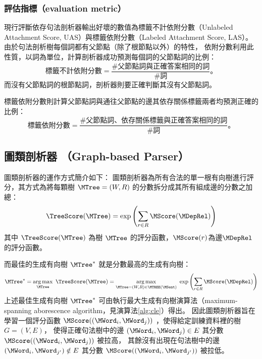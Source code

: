 \subsubsection{評估指標（evaluation metric）}

現行評斷依存句法剖析器輸出好壞的數值為標籤不計依附分數（Unlabeled Attachment Score, UAS）與標籤依附分數（Labeled Attachment Score, LAS）。
由於句法剖析樹每個詞都有父節點（除了根節點以外）的特性，
依附分數利用此性質，以詞為單位，計算剖析器成功預測每個詞的父節點詞的比例：
\begin{equation}
    \textrm{標籤不計依附分數} = \frac{\#\textrm{父節點詞與正確答案相同的詞}}{\#\textrm{詞}} \textrm{。}
\end{equation}
而沒有父節點詞的根節點詞，剖析器則要正確判斷其沒有父節點詞。

標籤依附分數則計算父節點詞與通往父節點的邊其依存關係標籤兩者均預測正確的比例：
\begin{equation}
    \textrm{標籤依附分數} = \frac{\#\textrm{父節點詞、依存關係標籤與正確答案相同的詞}}{\#\textrm{詞}} \textrm{。}
\end{equation}



\subsection{圖類剖析器 （Graph-based Parser）}
\label{subsec:graph_parser}

圖類剖析器的運作方式簡介如下：
圖類剖析器為所有合法的單一根有向樹進行評分，其方式為將每顆樹 $\MTree = (W, R)$ 的分數拆分成其所有組成邊的分數之加總：
\begin{equation}
    \TreeScore (\MTree) = \exp{ \left( \sum_{r \in R} \MScore(\MDepRel) \right) }
\end{equation}
其中 $\TreeScore(\MTree)$ 為樹 $\MTree$ 的評分函數，$\MScore(r)$為邊$\MDepRel$的評分函數。

而最佳的生成有向樹 $\MTree^{*}$ 就是分數最高的生成有向樹：
\begin{equation}
    \MTree^{*} = \argmax_{\MTree}\ \TreeScore (\MTree) = \argmax_{\MTree = (W, R) \in \MakeUppercase{\MTree}(\MSent)}\ \exp{ \left( \sum_{r \in R} \MScore(\MDepRel) \right) }
\end{equation}
上述最佳生成有向樹 $\MTree^{*}$ 可由執行最大生成有向樹演算法（maximum-spanning aborescence algorithm，見演算法\ref{alg:cle}）得出。
因此圖類剖析器旨在學習一個評分函數 $\MScore((\MWord_{i}, \MWord_{j}))$ ，使得給定訓練資料裡的樹$G=(V, E)$，
使得正確句法樹中的邊 $(\MWord_{i}, \MWord_{j}) \in E$ 其分數 $\MScore((\MWord_{i}, \MWord_{j}))$ 被拉高，
其餘沒有出現在句法樹中的邊 $(\MWord_{i}, \MWord_{j'}) \notin E$ 其分數 $\MScore((\MWord_{i}, \MWord_{j'}))$ 被拉低。

